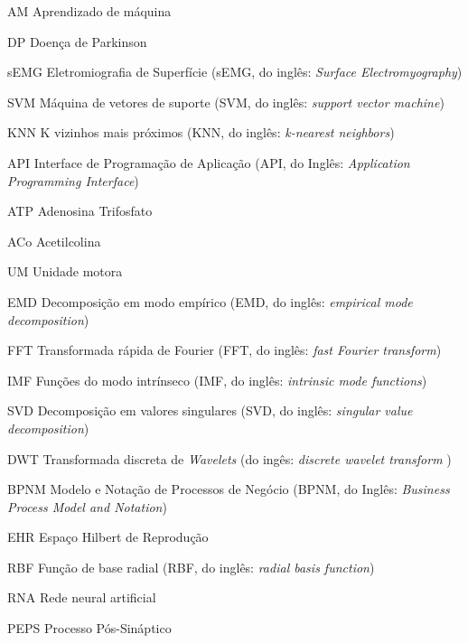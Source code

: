 \begin{siglas}
  \item[AM] Aprendizado de máquina
  \item[DP] Doença de Parkinson
  \item[sEMG] Eletromiografia de Superfície (sEMG, do inglês: \textit{Surface Electromyography})
  \item[SVM] Máquina de vetores de suporte (SVM, do inglês: \textit{support vector machine}) 
  \item[KNN] K vizinhos mais próximos (KNN, do inglês: \textit{k-nearest neighbors}) 
  \item[API] Interface de Programação de Aplicação (API, do Inglês: \textit{Application Programming Interface})
  \item[ATP] Adenosina Trifosfato
  \item[ACo] Acetilcolina
  \item[UM] Unidade motora
  \item[EMD] Decomposição em modo empírico (EMD, do inglês: \textit{empirical mode decomposition})
  \item[FFT] Transformada rápida de Fourier (FFT, do inglês: \textit{fast Fourier transform}) 
  \item[IMF] Funções do modo intrínseco (IMF, do inglês: \textit{intrinsic mode functions})
  \item[SVD] Decomposição em valores singulares (SVD, do inglês: \textit{singular value decomposition})
  \item[DWT] Transformada discreta de \textit{Wavelets} (do ingês: \textit{discrete wavelet transform })
  \item[BPNM] Modelo e Notação de Processos de Negócio (BPNM, do Inglês: \textit{Business Process Model and Notation})
  \item[EHR] Espaço Hilbert de Reprodução
  \item[RBF] Função de base radial (RBF, do inglês: \textit{radial basis function})
  \item[RNA] Rede neural artificial
  \item[PEPS] Processo Pós-Sináptico
\end{siglas}
